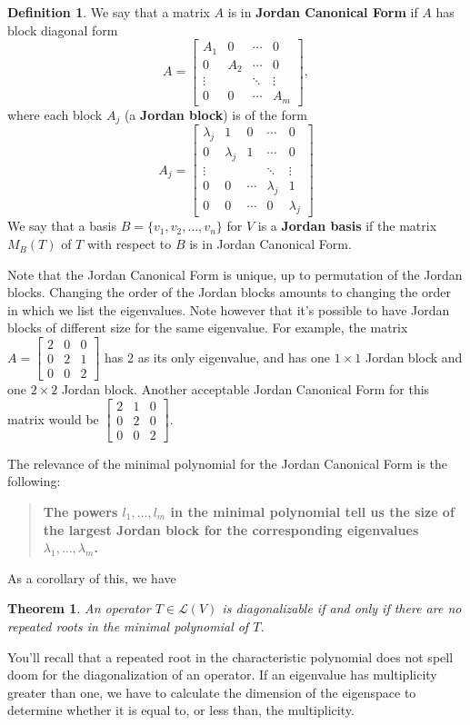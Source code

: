 \documentclass[12pt,letterpaper]{article}
\newtheorem{theorem}{Theorem}
\theoremstyle{definition}
\newtheorem{definition}{Definition}
\renewcommand{\L}{\mathcal{L}}
\begin{document}
\begin{definition}
 We say that a matrix $A$ is in {\bf Jordan Canonical Form} if $A$ has block diagonal form
\[
 A=\begin{bmatrix}
  A_1 &0&\cdots &0\\0&A_2&\cdots &0\\ \vdots & & \ddots & \vdots\\0&0&\cdots& A_m\end{bmatrix},
 \]
where each block $A_j$ (a {\bf Jordan block}) is of the form
\[
 A_j = \begin{bmatrix}
        \lambda_j&1&0&\cdots & 0\\
 0&\lambda_j&1&\cdots & 0\\
 \vdots& &&\ddots&\vdots\\
0&0&\cdots&\lambda_j &1\\
0&0&\cdots&0 &\lambda_j
       \end{bmatrix}
\]
We say that a basis $B=\{v_1,v_2,\ldots, v_n\}$ for $V$ is a {\bf Jordan basis} if the matrix $M_B(T)$ of $T$ with respect to $B$ is in Jordan Canonical Form.
\end{definition}
Note that the Jordan Canonical Form is unique, up to permutation of the Jordan blocks. Changing the order of the Jordan blocks amounts to changing the order in which we list the eigenvalues. Note however that it's possible to have Jordan blocks of different size for the same eigenvalue. For example, the matrix $A=\begin{bmatrix}2&0&0\\0&2&1\\0&0&2\end{bmatrix}$ has 2 as its only eigenvalue, and has one $1\times 1$ Jordan block and one $2\times 2$ Jordan block. Another acceptable Jordan Canonical Form for this matrix would be $\begin{bmatrix}2&1&0\\0&2&0\\0&0&2\end{bmatrix}$.

\bigskip

The relevance of the minimal polynomial for the Jordan Canonical Form is the following:
\begin{quotation}
 {\bf The powers $l_1,\ldots, l_m$ in the minimal polynomial tell us the size of the largest Jordan block for the corresponding eigenvalues $\lambda_1,\ldots, \lambda_m$.}
\end{quotation}
As a corollary of this, we have
\begin{theorem}
 An operator $T\in\L(V)$ is diagonalizable if and only if there are no repeated roots in the minimal polynomial of $T$.
\end{theorem}
You'll recall that a repeated root in the characteristic polynomial does not spell doom for the diagonalization of an operator. If an eigenvalue has multiplicity greater than one, we have to calculate the dimension of the eigenspace to determine whether it is equal to, or less than, the multiplicity.
\end{document}
